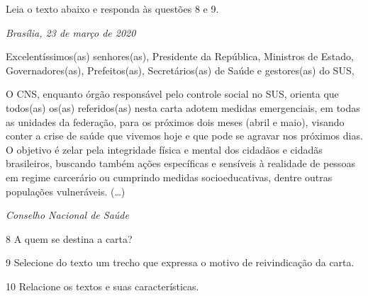 Leia o texto abaixo e responda às questões 8 e 9. 

\begin{myquote}

\emph{Brasília, 23 de março de 2020}

Excelentíssimos(as) senhores(as), Presidente da República, Ministros de
Estado, Governadores(as), Prefeitos(as), Secretários(as) de Saúde e
gestores(as) do SUS,

O CNS, enquanto órgão responsável pelo controle social no SUS, orienta
que todos(as) os(as) referidos(as) nesta carta adotem medidas
emergenciais, em todas as unidades da federação, para os próximos dois
meses (abril e maio), visando conter a crise de saúde que vivemos hoje e
que pode se agravar nos próximos dias. O objetivo é zelar pela
integridade física e mental dos cidadãos e cidadãs brasileiros, buscando
também ações específicas e sensíveis à realidade de pessoas em regime
carcerário ou cumprindo medidas socioeducativas, dentre outras
populações vulneráveis. (\ldots{})

\emph{Conselho Nacional de Saúde} 

\end{myquote} 


\num{8} A quem se destina a carta?


\num{9} Selecione do texto um trecho que expressa o motivo de reivindicação da carta.


\num{10} Relacione os textos e suas características.


